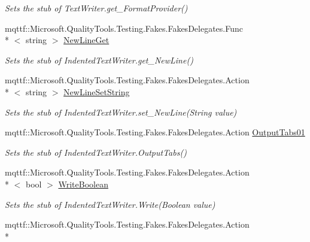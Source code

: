 \begin{DoxyCompactItemize}
\begin{DoxyCompactList}\small\item\em Sets the stub of Text\-Writer.\-get\-\_\-\-Format\-Provider()\end{DoxyCompactList}\item 
mqttf\-::\-Microsoft.\-Quality\-Tools.\-Testing.\-Fakes.\-Fakes\-Delegates.\-Func\\*
$<$ string $>$ \hyperlink{class_system_1_1_code_dom_1_1_compiler_1_1_fakes_1_1_stub_indented_text_writer_a22f92ceaf59e5523f4e4ed0dd0f1708d}{New\-Line\-Get}
\begin{DoxyCompactList}\small\item\em Sets the stub of Indented\-Text\-Writer.\-get\-\_\-\-New\-Line()\end{DoxyCompactList}\item 
mqttf\-::\-Microsoft.\-Quality\-Tools.\-Testing.\-Fakes.\-Fakes\-Delegates.\-Action\\*
$<$ string $>$ \hyperlink{class_system_1_1_code_dom_1_1_compiler_1_1_fakes_1_1_stub_indented_text_writer_ae22013b8d863a5172a5e3b7ac87b6e7e}{New\-Line\-Set\-String}
\begin{DoxyCompactList}\small\item\em Sets the stub of Indented\-Text\-Writer.\-set\-\_\-\-New\-Line(\-String value)\end{DoxyCompactList}\item 
mqttf\-::\-Microsoft.\-Quality\-Tools.\-Testing.\-Fakes.\-Fakes\-Delegates.\-Action \hyperlink{class_system_1_1_code_dom_1_1_compiler_1_1_fakes_1_1_stub_indented_text_writer_a39c8ada00f2535438cf97199a4592028}{Output\-Tabs01}
\begin{DoxyCompactList}\small\item\em Sets the stub of Indented\-Text\-Writer.\-Output\-Tabs()\end{DoxyCompactList}\item 
mqttf\-::\-Microsoft.\-Quality\-Tools.\-Testing.\-Fakes.\-Fakes\-Delegates.\-Action\\*
$<$ bool $>$ \hyperlink{class_system_1_1_code_dom_1_1_compiler_1_1_fakes_1_1_stub_indented_text_writer_a5aab0f0b685e07723ec37221921fda6f}{Write\-Boolean}
\begin{DoxyCompactList}\small\item\em Sets the stub of Indented\-Text\-Writer.\-Write(\-Boolean value)\end{DoxyCompactList}\item 
mqttf\-::\-Microsoft.\-Quality\-Tools.\-Testing.\-Fakes.\-Fakes\-Delegates.\-Action\\*

\end{DoxyCompactItemize}
